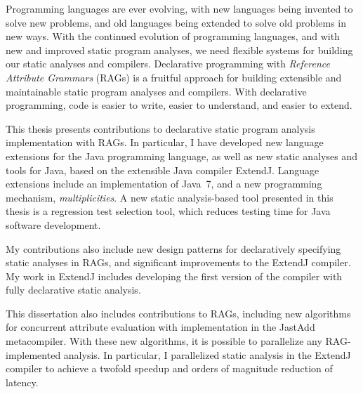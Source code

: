 Programming languages are ever evolving, with new languages being invented to solve new problems,
and old languages being extended to solve old problems in new ways.
With the continued evolution of programming languages, and with new and improved
static program analyses, we need flexible systems for building our static analyses and compilers.
Declarative programming with \emph{Reference Attribute Grammars} (RAGs) is a fruitful approach for
building extensible and maintainable static program analyses and compilers. With declarative programming,
code is easier to write, easier to understand, and easier to extend.

This thesis presents contributions to declarative static program analysis implementation with RAGs.
In particular, I have developed new language extensions for the Java programming language,
as well as new static analyses and tools for Java, based on the extensible Java compiler ExtendJ.
Language extensions include an implementation of Java~7, and a new programming mechanism,
\emph{multiplicities}. A new static analysis-based tool presented in this thesis is a
regression test selection tool, which reduces testing time for Java software development.

My contributions also include new design patterns for declaratively specifying static analyses
in RAGs, and significant improvements to the ExtendJ compiler. My work in ExtendJ includes
developing the first version of the compiler with fully declarative static analysis.

This dissertation also includes contributions to RAGs, including new algorithms for concurrent
attribute evaluation with implementation in the JastAdd metacompiler. With these new algorithms,
it is possible to parallelize any RAG-implemented analysis.
In particular, I parallelized static analysis in the ExtendJ compiler
to achieve a twofold speedup and orders of magnitude reduction of latency.
